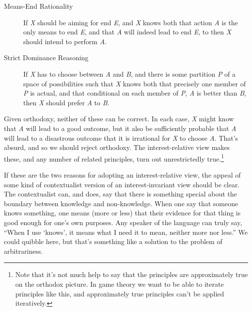 \documentclass[
  12pt,
  letterpaper,
]{scrbook}
\begin{document}
\begin{description}
\item[Means-End Rationality]
If \emph{X} should be aiming for end \emph{E}, and \emph{X} knows both
that action \emph{A} is the only means to end \emph{E}, and that
\emph{A} will indeed lead to end \emph{E}, to then \emph{X} should
intend to perform \emph{A}.
\item[Strict Dominance Reasoning]
If \emph{X} has to choose between \emph{A} and \emph{B}, and there is
some partition \emph{P} of a space of possibilities such that \emph{X}
knows both that precisely one member of \emph{P} is actual, and that
conditional on each member of \emph{P}, \emph{A} is better than
\emph{B}, then \emph{X} should prefer \emph{A} to \emph{B}.
\end{description}

Given orthodoxy, neither of these can be correct. In each case, \emph{X}
might know that \emph{A} will lead to a good outcome, but it also be
sufficiently probable that \emph{A} will lead to a disastrous outcome
that it is irrational for \emph{X} to choose \emph{A}. That's absurd,
and so we should reject orthodoxy. The interest-relative view makes
these, and any number of related principles, turn out unrestrictedly
true.\footnote{Note that it's not much help to say that the principles
  are approximately true on the orthodox picture. In game theory we want
  to be able to iterate principles like this, and approximately true
  principles can't be applied iteratively.}

If these are the two reasons for adopting an interest-relative view, the
appeal of some kind of contextualist version of an interest-invariant
view should be clear. The contextualist can, and does, say that there is
something special about the boundary between knowledge and
non-knowledge. When one say that someone knows something, one means
(more or less) that their evidence for that thing is good enough for
one's own purposes. Any speaker of the language can truly say, ``When I
use `knows', it means what I need it to mean, neither more nor less.''
We could quibble here, but that's something like a solution to the
problem of arbitrariness.
\end{document}
